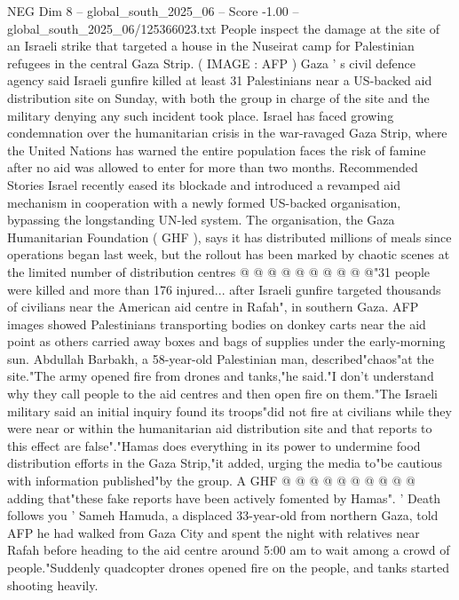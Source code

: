 \begin{textsample}{NEG Dim 8 – global\_south\_2025\_06 – Score -1.00 – global\_south\_2025\_06/125366023.txt}  \label{ex:f8_neg_256}
People inspect the damage at the site of an Israeli strike that targeted a house in the Nuseirat camp for Palestinian refugees in the central Gaza Strip. ( IMAGE : AFP ) Gaza ' s civil defence agency said Israeli gunfire killed at least 31 Palestinians near a US-backed aid distribution site on Sunday, with both the group in charge of the site and the military denying any such incident took place.
Israel has faced growing condemnation over the humanitarian crisis in the war-ravaged Gaza Strip, where the United Nations has warned the entire population faces the risk of famine after no aid was allowed to enter for more than two months.
Recommended Stories Israel recently eased its blockade and introduced a revamped aid mechanism in cooperation with a newly formed US-backed organisation, bypassing the longstanding UN-led system.
The organisation, the Gaza Humanitarian Foundation ( GHF ), says it has distributed millions of meals since operations began last week, but the rollout has been marked by chaotic scenes at the limited number of distribution centres @ @ @ @ @ @ @ @ @ @"31 people were killed and more than 176 injured... after Israeli gunfire targeted thousands of civilians near the American aid centre in Rafah", in southern Gaza.
AFP images showed Palestinians transporting bodies on donkey carts near the aid point as others carried away boxes and bags of supplies under the early-morning sun.
Abdullah Barbakh, a 58-year-old Palestinian man, described"chaos"at the site."The army opened fire from drones and tanks,"he said."I don't understand why they call people to the aid centres and then open fire on them."The Israeli military said an initial inquiry found its troops"did not fire at civilians while they were near or within the humanitarian aid distribution site and that reports to this effect are false"."Hamas does everything in its power to undermine food distribution efforts in the Gaza Strip,"it added, urging the media to"be cautious with information published"by the group.
A GHF @ @ @ @ @ @ @ @ @ @ adding that"these fake reports have been actively fomented by Hamas". ' Death follows you ' Sameh Hamuda, a displaced 33-year-old from northern Gaza, told AFP he had walked from Gaza City and spent the night with relatives near Rafah before heading to the aid centre around 5:00 am to wait among a crowd of people."Suddenly quadcopter drones opened fire on the people, and tanks started shooting heavily.

\end{textsample}

